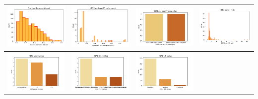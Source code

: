\begin{center} 
	\begin{tabular}{ |c|c|c|c| }  
		\hline 
		\includegraphics[width=.25\textwidth]{NOTEBOOK/IMAGENES_CRUDAS/29} 
		& \includegraphics[width=.25\textwidth]{NOTEBOOK/IMAGENES_CRUDAS/30} 
		& \includegraphics[width=.25\textwidth]{NOTEBOOK/IMAGENES_CRUDAS/31} 
		& \includegraphics[width=.25\textwidth]{NOTEBOOK/IMAGENES_CRUDAS/32}   
		\\  \hline   
		\includegraphics[width=.22\textwidth]{NOTEBOOK/IMAGENES_CRUDAS/33} 
		& \includegraphics[width=.25\textwidth]{NOTEBOOK/IMAGENES_CRUDAS/34}
		& \includegraphics[width=.25\textwidth]{NOTEBOOK/IMAGENES_CRUDAS/35}

\end{tabular}
\end{center}
